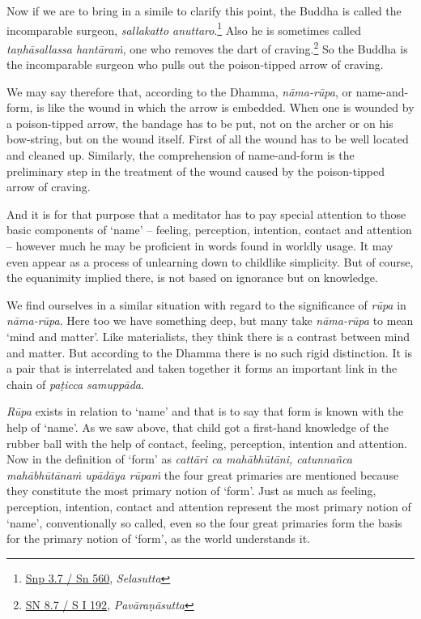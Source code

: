 Now if we are to bring in a simile to clarify this point, the Buddha is called the incomparable surgeon, \emph{sallakatto anuttaro}.\footnote{\href{https://suttacentral.net/snp3.7/pli/ms}{Snp 3.7 / Sn 560}, \emph{Selasutta}} Also he is sometimes called \emph{taṇhāsallassa hantāraṁ}, one who removes the dart of craving.\footnote{\href{https://suttacentral.net/sn8.7/pli/ms}{SN 8.7 / S I 192}, \emph{Pavāraṇāsutta}} So the Buddha is the incomparable surgeon who pulls out the poison-tipped arrow of craving.

We may say therefore that, according to the Dhamma, \emph{nāma-rūpa}, or name-and-form, is like the wound in which the arrow is embedded. When one is wounded by a poison-tipped arrow, the bandage has to be put, not on the archer or on his bow-string, but on the wound itself. First of all the wound has to be well located and cleaned up. Similarly, the comprehension of name-and-form is the preliminary step in the treatment of the wound caused by the poison-tipped arrow of craving.

And it is for that purpose that a meditator has to pay special attention to those basic components of `name' -- feeling, perception, intention, contact and attention -- however much he may be proficient in words found in worldly usage. It may even appear as a process of unlearning down to childlike simplicity. But of course, the equanimity implied there, is not based on ignorance but on knowledge.

We find ourselves in a similar situation with regard to the significance of \emph{rūpa} in \emph{nāma-rūpa}. Here too we have something deep, but many take \emph{nāma-rūpa} to mean `mind and matter'. Like materialists, they think there is a contrast between mind and matter. But according to the Dhamma there is no such rigid distinction. It is a pair that is interrelated and taken together it forms an important link in the chain of \emph{paṭicca samuppāda}.

\emph{Rūpa} exists in relation to `name' and that is to say that form is known with the help of `name'. As we saw above, that child got a first-hand knowledge of the rubber ball with the help of contact, feeling, perception, intention and attention. Now in the definition of `form' as \emph{cattāri ca mahābhūtāni, catunnañca mahābhūtānaṁ upādāya rūpaṁ} the four great primaries are mentioned because they constitute the most primary notion of `form'. Just as much as feeling, perception, intention, contact and attention represent the most primary notion of `name', conventionally so called, even so the four great primaries form the basis for the primary notion of `form', as the world understands it.

